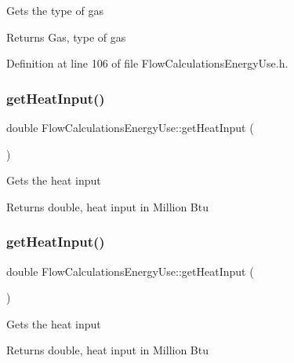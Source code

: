 Gets the type of gas

\begin{DoxyReturn}{Returns}
Gas, type of gas 
\end{DoxyReturn}


Definition at line 106 of file Flow\+Calculations\+Energy\+Use.\+h.

\mbox{\label{class_flow_calculations_energy_use_af2d2196911d4784d72b14dff83295b19}} 
\subsubsection{\texorpdfstring{get\+Heat\+Input()}{getHeatInput()}\hspace{0.1cm}{\footnotesize\ttfamily [1/3]}}
{\footnotesize\ttfamily double Flow\+Calculations\+Energy\+Use\+::get\+Heat\+Input (\begin{DoxyParamCaption}{ }\end{DoxyParamCaption})}

Gets the heat input

\begin{DoxyReturn}{Returns}
double, heat input in Million Btu 
\end{DoxyReturn}
\mbox{\label{class_flow_calculations_energy_use_af2d2196911d4784d72b14dff83295b19}} 
\subsubsection{\texorpdfstring{get\+Heat\+Input()}{getHeatInput()}\hspace{0.1cm}{\footnotesize\ttfamily [2/3]}}
{\footnotesize\ttfamily double Flow\+Calculations\+Energy\+Use\+::get\+Heat\+Input (\begin{DoxyParamCaption}{ }\end{DoxyParamCaption})}

Gets the heat input

\begin{DoxyReturn}{Returns}
double, heat input in Million Btu 
\end{DoxyReturn}


